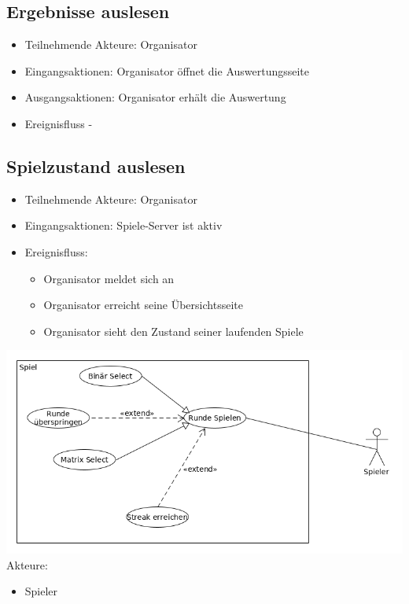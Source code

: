 \documentclass[a4paper]{scrreprt}
\begin{document}
    \subsection{Ergebnisse auslesen}

    \begin{itemize}
        \item Teilnehmende Akteure: \Gls{Organisator}
        \item Eingangsaktionen: \Gls{Organisator} öffnet die Auswertungsseite
        \item Ausgangsaktionen: \Gls{Organisator} erhält die Auswertung
        \item Ereignisfluss -
    \end{itemize}
 \subsection{Spielzustand auslesen}
	\begin{itemize}
		\item Teilnehmende Akteure: \Gls{Organisator}
		\item Eingangsaktionen: Spiele-Server ist aktiv
		\item Ereignisfluss:
		\begin{itemize}
			\item \Gls{Organisator} meldet sich an
			\item \Gls{Organisator} erreicht seine Übersichtsseite
			\item \Gls{Organisator} sieht den Zustand seiner laufenden Spiele
		\end{itemize}
	\end{itemize}


    \newpage
    \includegraphics[width=\textwidth]{uml/export/Spiel.png}
    Akteure: 
    \begin{itemize}
    \item \Gls{Spieler}
    \newpage
    \end{itemize}
    
\end{document}
